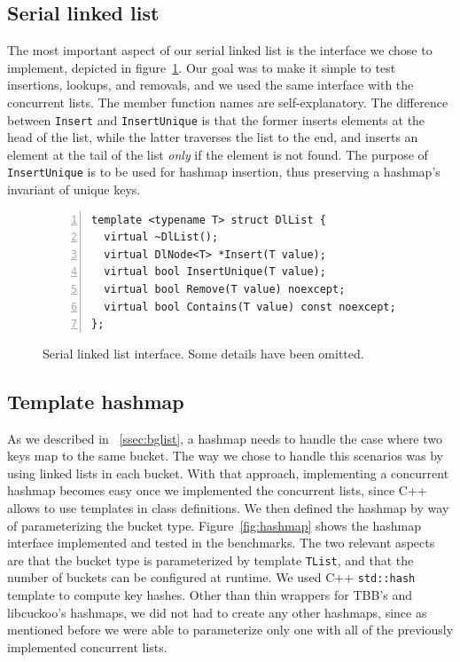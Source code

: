\documentclass[11pt]{article}
\begin{document}
\subsection{Serial linked list}
The most important aspect of our serial linked list is the interface we chose to
implement, depicted in figure~\ref{fig:dllist}. Our goal was to make it simple
to test insertions, lookups, and removals, and we used the same interface with
the concurrent lists. The member function names are self-explanatory. The
difference between {\tt Insert} and {\tt InsertUnique} is that the former
inserts elements at the head of the list, while the latter traverses the list to
the end, and inserts an element at the tail of the list {\em only} if the
element is not found. The purpose of {\tt InsertUnique} is to be used for
hashmap insertion, thus preserving a hashmap's invariant of unique keys.

\begin{figure}[h]
\begin{center}
\begin{lstlisting}[numbers=left]
template <typename T> struct DlList {
  virtual ~DlList();
  virtual DlNode<T> *Insert(T value);
  virtual bool InsertUnique(T value);
  virtual bool Remove(T value) noexcept;
  virtual bool Contains(T value) const noexcept;
};
\end{lstlisting}
\caption{Serial linked list interface. Some details have been omitted.}
\label{fig:dllist}
\end{center}
\end{figure}

\subsection{Template hashmap}
As we described in ~\ref{ssec:bglist}, a hashmap
needs to handle the case where two keys map to the same bucket. The way we chose
to handle this scenarios was by using linked lists in each bucket. With
that approach, implementing a concurrent hashmap becomes easy once we
implemented the concurrent lists, since C++ allows to use templates in class
definitions. We then defined the hashmap by way of parameterizing the bucket
type. Figure~\ref{fig:hashmap} shows the hashmap interface implemented and
tested in the benchmarks. The two relevant aspects are that the bucket type is
parameterized by template {\tt TList}, and that the number of buckets can be
configured at runtime. We used C++ {\tt std::hash} template to compute key
hashes. Other than thin wrappers for TBB's and libcuckoo's hashmaps, we did not
had to create any other hashmaps, since as mentioned before we were able to
parameterize only one with all of the previously implemented concurrent lists.
\end{document}
